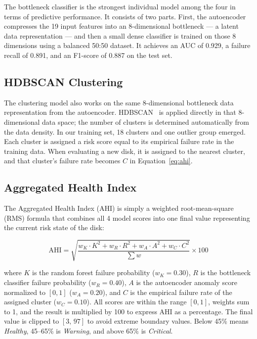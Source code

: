 \documentclass[sigconf,natbib=false]{acmart}
\begin{document}
The bottleneck classifier is the strongest individual model among the four in terms of predictive performance. It consists of two parts. First, the autoencoder compresses the 19 input features into an 8-dimensional bottleneck — a latent data representation — and then a small dense classifier is trained on those 8 dimensions using a balanced 50:50 dataset. It achieves an AUC of 0.929, a failure recall of 0.891, and an F1-score of 0.887 on the test set.

\subsection{HDBSCAN Clustering}

The clustering model also works on the same 8-dimensional bottleneck data representation from the autoencoder. HDBSCAN~\cite{campello2013hdbscan,mcinnes2017hdbscan} is applied directly in that 8-dimensional data space; the number of clusters is determined automatically from the data density. In our training set, 18 clusters and one outlier group emerged. Each cluster is assigned a risk score equal to its empirical failure rate in the training data. When evaluating a new disk, it is assigned to the nearest cluster, and that cluster's failure rate becomes $C$ in Equation~\ref{eq:ahi}.

\subsection{Aggregated Health Index}

The Aggregated Health Index (AHI) is simply a weighted root-mean-square (RMS) formula that combines all 4 model scores into one final value representing the current risk state of the disk:

\begin{equation}
\mathrm{AHI} = \sqrt{\frac{w_K \cdot K^2 + w_R \cdot R^2 + w_A \cdot A^2 + w_C \cdot C^2}{\sum w}} \times 100
\label{eq:ahi}
\end{equation}

\noindent where $K$ is the random forest failure probability ($w_K = 0.30$), $R$ is the bottleneck classifier failure probability ($w_R = 0.40$), $A$ is the autoencoder anomaly score normalized to $[0,1]$ ($w_A = 0.20$), and $C$ is the empirical failure rate of the assigned cluster ($w_C = 0.10$). All scores are within the range $[0,1]$, weights sum to 1, and the result is multiplied by 100 to express AHI as a percentage. The final value is clipped to $[3,\,97]$ to avoid extreme boundary values. Below 45\% means \emph{Healthy}, 45--65\% is \emph{Warning}, and above 65\% is \emph{Critical}.
\end{document}
